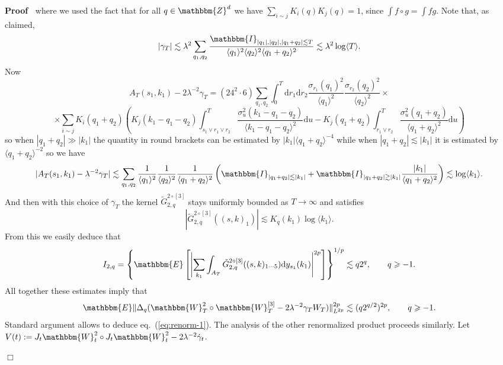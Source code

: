 \documentclass[11pt, oneside]{article}   	%
\newcommand{\assign}{:=}
\newcommand{\mathd}{\mathrm{d}}
\newenvironment{proof}{\noindent\textbf{Proof\ }}{\hspace*{\fill}$\Box$\medskip}
\begin{document}
\begin{proof}
  where we used the fact that for all $q \in \mathbbm{Z}^d$ we have $\sum_{i
  \sim j} K_i (q) K_j (q) = 1$, since $\int f \circ g = \int f g$. Note that,
  as claimed,
  \[ | \gamma_T | \lesssim \lambda^2 \sum_{q_1, q_2} \frac{\mathbbm{I}_{| q_1
     |, | q_2 |, | q_1 + q_2 | \lesssim T}}{\langle q_1 \rangle^2 \langle q_2
     \rangle^2 \langle q_1 + q_2 \rangle^2} \lesssim \lambda^2 \log \langle T
     \rangle . \]
  Now
  \[ A_T (s_1, k_1) - 2 \lambda^{- 2} \gamma_T = (24^2 \cdot 6) \sum_{q_1,
     q_2} \int_0^T \mathd r_1 \mathd r_2 \frac{\sigma_{r_1} (q_1)^2}{\langle
     q_1 \rangle^2} \frac{\sigma_{r_2} (q_2)^2}{\langle q_2 \rangle^2} \times
  \]
  \[ \times \sum_{i \sim j} K_i (q_1 + q_2) \left( K_j (k_1 - q_1 - q_2)
     \int_{s_1 \vee r_1 \vee r_2}^T \frac{\sigma_u^2 (k_1 - q_1 -
     q_2)}{\langle k_1 - q_1 - q_2 \rangle^2} \mathd u - K_j (q_1 + q_2)
     \int_{r_1 \vee r_2}^T \frac{\sigma_u^2 (q_1 + q_2)}{\langle q_1 + q_2
     \rangle^2} \mathd u \right) \]
  so when $| q_1 + q_2 | \gg | k_1 |$ the quantity in round brackets can be
  estimated by $| k_1 | \langle q_1 + q_2 \rangle^{- 4}$ while when $| q_1 +
  q_2 | \lesssim | k_1 |$ it is estimated by $\langle q_1 + q_2 \rangle^{- 2}$
  so we have
  \[ | A_T (s_1, k_1) - \lambda^{- 2} \gamma_T | \lesssim \sum_{q_1, q_2}
     \frac{1}{\langle q_1 \rangle^2} \frac{1}{\langle q_2 \rangle^2}
     \frac{1}{\langle q_1 + q_2 \rangle^2} \left( \mathbbm{I}_{| q_1 + q_2 |
     \lesssim | k_1 |} +\mathbbm{I}_{| q_1 + q_2 | \gtrsim | k_1 |} \frac{|
     k_1 |}{\langle q_1 + q_2 \rangle^2} \right) \lesssim \log \langle k_1
     \rangle . \]
  And then with this choice of $\gamma_T$ the kernel $\tilde{G}^{2 \circ
  [3]}_{2, q}$ stays uniformly bounded as $T \rightarrow \infty$ and satisfies
  \[ | \tilde{G}^{2 \circ [3]}_{2, q} ((s, k)_1) | \lesssim K_q (k_1) \log
     \langle k_1 \rangle . \]
  From this we easily deduce that
  \[ I_{2, q} = \left\{ \mathbbm{E} \left[ \left| \sum_{k_1} \int_{A_T}
     \tilde{G}^{2 \circ [3]}_{2, q} ((s, k)_{1 \cdots 5}) \mathd y_{s_1} (k_1)
     \right|^{2 p} \right] \right\}^{1 / p} \lesssim q 2^q, \qquad q \geqslant
     - 1. \]
  All together these estimates imply that
  \[ \mathbbm{E} \| \Delta_q (\mathbbm{W}^2_T \circ \mathbbm{W}^{[3]}_T - 2
     \lambda^{- 2} \gamma_T W_T) \|_{L^{2 p}}^{2 p} \lesssim (q 2^{q / 2})^{2
     p}, \qquad q \geqslant - 1. \]
  Standard argument allows to deduce eq.~(\ref{eq:renorm-1}). The analysis of
  the other renormalized product proceeds similarly. Let $V (t) \assign J_t
  \mathbbm{W}^2_t \circ J_t \mathbbm{W}^2_t - 2 \lambda^{- 2} \dot{\gamma}_t$.

\end{proof}
\end{document}
